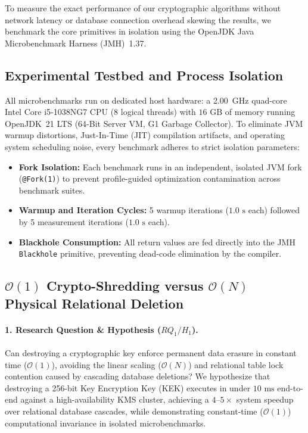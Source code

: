 To measure the exact performance of our cryptographic algorithms without network latency or database connection overhead skewing the results, we benchmark the core primitives in isolation using the OpenJDK Java Microbenchmark Harness (JMH)~1.37.

\subsection{Experimental Testbed and Process Isolation}

All microbenchmarks run on dedicated host hardware: a 2.00~GHz quad-core Intel Core i5-1038NG7 CPU (8 logical threads) with $16\text{~GB}$ of memory running OpenJDK~21 LTS (64-Bit Server VM, G1 Garbage Collector). To eliminate JVM warmup distortions, Just-In-Time (JIT) compilation artifacts, and operating system scheduling noise, every benchmark adheres to strict isolation parameters:
\begin{itemize}
    \item \textbf{Fork Isolation:} Each benchmark runs in an independent, isolated JVM fork (\texttt{@Fork(1)}) to prevent profile-guided optimization contamination across benchmark suites.
    \item \textbf{Warmup and Iteration Cycles:} 5 warmup iterations ($1.0\text{~s}$ each) followed by 5 measurement iterations ($1.0\text{~s}$ each).
    \item \textbf{Blackhole Consumption:} All return values are fed directly into the JMH \texttt{Blackhole} primitive, preventing dead-code elimination by the compiler.
\end{itemize}

\subsection{$\mathcal{O}(1)$ Crypto-Shredding versus $\mathcal{O}(N)$ Physical Relational Deletion}

\paragraph{1. Research Question \& Hypothesis ($RQ_1 / H_1$).}
Can destroying a cryptographic key enforce permanent data erasure in constant time ($\mathcal{O}(1)$), avoiding the linear scaling ($\mathcal{O}(N)$) and relational table lock contention caused by cascading database deletions? We hypothesize that destroying a 256-bit Key Encryption Key (KEK) executes in under $10\text{~ms}$ end-to-end against a high-availability KMS cluster, achieving a $4\text{--}5\times$ system speedup over relational database cascades, while demonstrating constant-time ($\mathcal{O}(1)$) computational invariance in isolated microbenchmarks.

